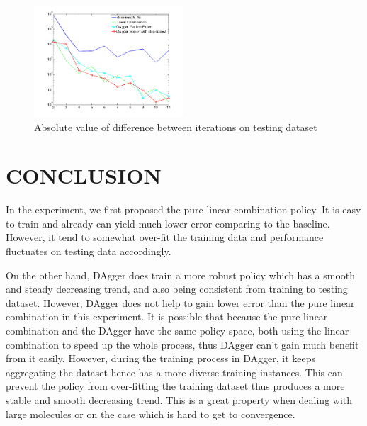 \documentclass[twoside,11pt]{article}
\begin{document}
\begin{figure}[h!]
\center
  \caption{Absolute value of difference between iterations on testing dataset}
  \label{fig:converge_testing}
    \includegraphics[width=210px]{convergence_Testing.png}
\end{figure}


\section{CONCLUSION}
In the experiment, we first proposed the pure linear combination policy. It is easy to train and already can yield much lower error comparing to the baseline. However, it tend to somewhat over-fit the training data and performance fluctuates on testing data accordingly. 

On the other hand, DAgger does train a more robust policy which has a smooth and steady decreasing trend, and also being consistent from training to testing dataset. However, DAgger does not help to gain lower error than the pure linear combination in this experiment. It is possible that because the pure linear combination and the DAgger have the same policy space, both using the linear combination to speed up the whole process, thus DAgger can't gain much benefit from it easily. However, during the training process in DAgger, it keeps aggregating the dataset hence has a more diverse training instances. This can prevent the policy from over-fitting the training dataset thus produces a more stable and smooth decreasing trend. This is a great property when dealing with large molecules or on the case which is hard to get to convergence.
\end{document}
